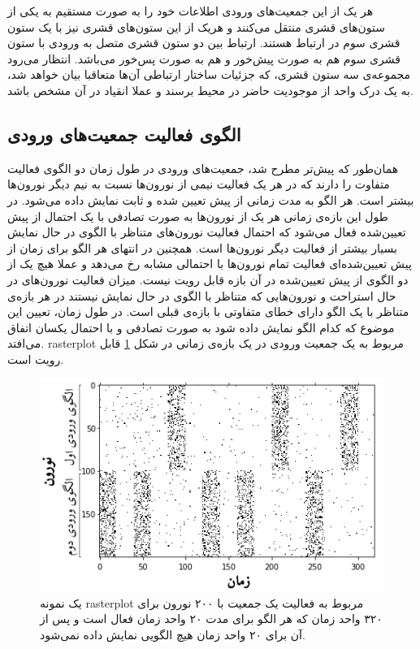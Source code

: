 \documentclass[12pt]{report}
\begin{document}
	هر یک از این جمعیت‌های ورودی اطلاعات خود‌ را به صورت مستقیم به یکی از ستون‌های قشری منتقل می‌کنند و هریک از این ستون‌های قشری نیز با یک ستون قشری سوم در ارتباط هستند. ارتباط بین دو ستون قشری متصل به ورودی با ستون قشری سوم هم به صورت پیش‌خور و هم به صورت پس‌خور می‌باشد. انتظار می‌رود مجموعه‌ی سه ستون قشری، که جزئیات ساختار ارتباطی آن‌ها متعاقبا بیان خواهد شد، به یک درک واحد از موجودیت حاضر در محیط برسند و عملا انقیاد در آن مشخص باشد.
	
	
	\subsection{الگوی فعالیت جمعیت‌های ورودی}
	
	همان‌طور که پیش‌تر مطرح شد، جمعیت‌های ورودی در طول زمان دو الگوی فعالیت متفاوت را دارند که در هر‌ یک فعالیت نیمی از نورون‌ها نسبت به نیم دیگر نورون‌ها بیشتر است. هر الگو به مدت زمانی از پیش تعیین شده و ثابت نمایش داده می‌شود. در طول این بازه‌ی زمانی هر یک از نورون‌ها به صورت تصادفی با یک احتمال از پیش تعیین‌شده فعال می‌شود که احتمال فعالیت نورون‌های متناظر با الگوی در حال نمایش بسیار بیشتر از فعالیت دیگر نورون‌ها است. همچنین در انتهای هر الگو برای زمان از پیش تعیین‌شده‌ای فعالیت تمام نورون‌ها با احتمالی مشابه رخ می‌دهد  و عملا هیچ یک از دو الگوی از پیش تعیین‌شده در آن بازه قابل رویت نیست. میزان فعالیت نورون‌های در حال استراحت و نورون‌هایی که متناظر با الگوی در حال نمایش نیستند در هر بازه‌ی متناظر با یک الگو دارای خطای متفاوتی با بازه‌ی قبلی است.	
	در طول زمان، تعیین این موضوع که کدام الگو نمایش داده شود به صورت تصادفی و با احتمال یکسان اتفاق می‌افتد. \gls{rasterplot} مربوط به یک جمعیت ورودی در یک بازه‌ی زمانی در شکل \ref{fig:input-range} قابل رویت است.
	
\begin{figure}[]
	\centering
	\includegraphics[width=1.0\linewidth]{input-range.png}
	\caption[NS]{
		یک نمونه \gls{rasterplot} مربوط به فعالیت یک جمعیت با ۲۰۰ نورون برای ۳۲۰ واحد زمان که هر الگو برای مدت ۲۰ واحد زمان فعال است و پس از آن برای ۲۰ واحد زمان هیچ الگویی نمایش داده نمی‌شود.
	}
	\label{fig:input-range} 
\end{figure}
	
\end{document}
